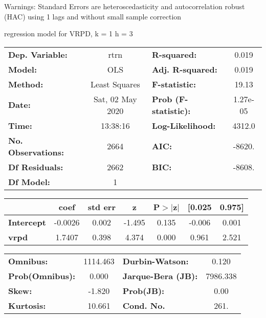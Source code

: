 Warnings: \newline
 [1] Standard Errors are heteroscedasticity and autocorrelation robust (HAC) using 1 lags and without small sample correction\ 

regression model for VRPD, k = 1 h = 3\begin{center}
\begin{tabular}{lclc}
\toprule
\textbf{Dep. Variable:}    &       rtrn       & \textbf{  R-squared:         } &     0.019   \\
\textbf{Model:}            &       OLS        & \textbf{  Adj. R-squared:    } &     0.019   \\
\textbf{Method:}           &  Least Squares   & \textbf{  F-statistic:       } &     19.13   \\
\textbf{Date:}             & Sat, 02 May 2020 & \textbf{  Prob (F-statistic):} &  1.27e-05   \\
\textbf{Time:}             &     13:38:16     & \textbf{  Log-Likelihood:    } &    4312.0   \\
\textbf{No. Observations:} &        2664      & \textbf{  AIC:               } &    -8620.   \\
\textbf{Df Residuals:}     &        2662      & \textbf{  BIC:               } &    -8608.   \\
\textbf{Df Model:}         &           1      & \textbf{                     } &             \\
\bottomrule
\end{tabular}
\begin{tabular}{lcccccc}
                   & \textbf{coef} & \textbf{std err} & \textbf{z} & \textbf{P$> |$z$|$} & \textbf{[0.025} & \textbf{0.975]}  \\
\midrule
\textbf{Intercept} &      -0.0026  &        0.002     &    -1.495  &         0.135        &       -0.006    &        0.001     \\
\textbf{vrpd}      &       1.7407  &        0.398     &     4.374  &         0.000        &        0.961    &        2.521     \\
\bottomrule
\end{tabular}
\begin{tabular}{lclc}
\textbf{Omnibus:}       & 1114.463 & \textbf{  Durbin-Watson:     } &    0.120  \\
\textbf{Prob(Omnibus):} &   0.000  & \textbf{  Jarque-Bera (JB):  } & 7986.338  \\
\textbf{Skew:}          &  -1.820  & \textbf{  Prob(JB):          } &     0.00  \\
\textbf{Kurtosis:}      &  10.661  & \textbf{  Cond. No.          } &     261.  \\
\bottomrule
\end{tabular}
\end{center}

